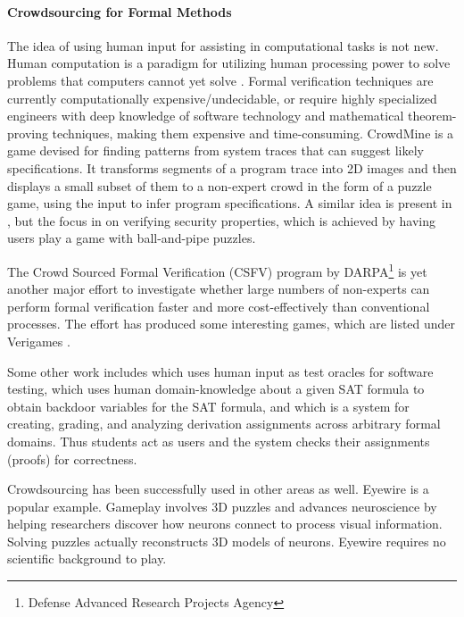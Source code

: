 \paragraph{Crowdsourcing for Formal Methods}
The idea of using human input for assisting in computational tasks is not new. Human
computation is a paradigm for utilizing human processing power to solve problems that
computers cannot yet solve \cite{vonahn2005, quinn2011}. Formal verification techniques
are currently computationally expensive/undecidable, or require highly specialized
engineers with deep knowledge of software technology and mathematical theorem-proving
techniques, making them expensive and time-consuming. CrowdMine \cite{wenchao2012} is a
game devised for finding patterns from system traces that can suggest likely
specifications. It transforms segments of a program trace into 2D images and then
displays a small subset of them to a non-expert crowd in the form of a puzzle game,
using the input to infer program specifications. A similar idea is present in
\cite{ernst2012}, but the focus in on verifying security properties, which is achieved
by having users play a game with ball-and-pipe puzzles.

The Crowd Sourced Formal Verification (CSFV) program by
DARPA\footnote{Defense Advanced Research Projects Agency} is yet another major effort to
investigate whether large numbers of non-experts can perform formal verification faster
and more cost-effectively than conventional processes. The effort has produced some
interesting games, which are listed under Verigames \cite{verigames}.

Some other work includes \cite{pastore2013} which uses human input as test oracles for
software testing, \cite{lebras2013} which uses human domain-knowledge about a given SAT
formula to obtain backdoor variables for the SAT formula, and \cite{fast2013} which is a
system for creating, grading, and analyzing derivation assignments across arbitrary
formal domains. Thus students act as users and the system checks their assignments
(proofs) for correctness.

Crowdsourcing has been successfully used in other areas as well. Eyewire \cite{eyewire}
is a popular example. Gameplay involves 3D puzzles and advances neuroscience by helping
researchers discover how neurons connect to process visual information. Solving puzzles
actually reconstructs 3D models of neurons. Eyewire requires no scientific background to
play.


